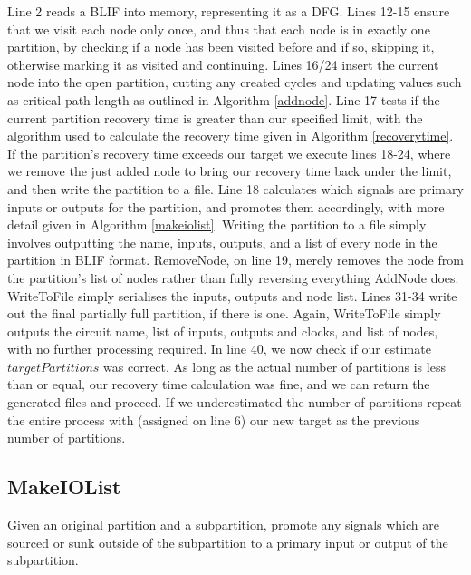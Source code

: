 \documentclass[12pt,final,oneside]{dwThesis} %
\begin{document}
   \FloatBarrier
   Line 2 reads a \gls{BLIF} into memory, representing it as a \gls{DFG}.
   Lines 12-15 ensure that we visit each node only once, and thus that each node is
   in exactly one partition, by checking if a node has been visited before and
   if so, skipping it, otherwise marking it as visited and continuing.  Lines
   16/24 insert the current node into the open partition, cutting any created
   cycles and updating values such as critical path length as outlined in
   Algorithm \ref{addnode}.  Line 17 tests if the current partition recovery
   time is greater than our specified limit, with the algorithm used to
   calculate the recovery time given in Algorithm \ref{recoverytime}.  If the
   partition's recovery time exceeds our target we execute lines 18-24, where
   we remove the just added node to bring our recovery time back under the
   limit, and then write the partition to a file.  Line 18 calculates which
   signals are primary inputs or outputs for the partition, and promotes them
   accordingly, with more detail given in Algorithm \ref{makeiolist}.  Writing
   the partition to a file simply involves outputting the name, inputs,
   outputs, and a list of every node in the partition in \gls{BLIF} format.
   RemoveNode, on line 19, merely removes the node from the partition's list of
   nodes rather than fully reversing everything AddNode does. WriteToFile
   simply serialises the inputs, outputs and node list.  Lines 31-34 write out
   the final partially full partition, if there is one. Again, WriteToFile
   simply outputs the circuit name, list of inputs, outputs and clocks, and
   list of nodes, with no further processing required.
   In line 40, we now check if our estimate $targetPartitions$ was correct. As long as the actual number of partitions is less than or equal, our recovery time
   calculation was fine, and we can return the generated files and proceed.
   If we underestimated the number of partitions repeat the entire process with (assigned on line 6) our new target as the previous number of partitions.


   \newpage 
   \subsection{MakeIOList}
   Given an original partition and a
   subpartition, promote any signals which are sourced or sunk outside of the
   subpartition to a primary input or output of the subpartition.
\end{document}
